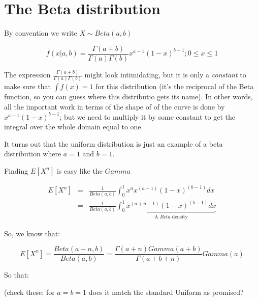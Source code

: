 \documentclass[12pt]{extbook}
\begin{document}



\section{The Beta distribution}

{\color{green} By convention we write $X \sim Beta(a,b)$}

\begin{displaymath}
f(x|a,b) = \frac{\Gamma(a + b)}{\Gamma(a)\Gamma(b)} x^{a-1}(1-x)^{b-1};0 \leq x \leq 1
\end{displaymath}

The expression $\frac{\Gamma(a + b)}{\Gamma(a)\Gamma(b)}$ might look intimidating, but it is only a \emph{constant} to make sure that $\int f(x)=1$ for this distribution (it's the reciprocal of the Beta function, so you can guess where this distributio gets its name).   In other words, all the important work in terms of the shape of of the curve is done by $ x^{a-1}(1-x)^{b-1}$; but we need to multiply it by some constant to get the integral over the whole domain equal to one.

It turns out that the uniform distribution is just an example of a beta distribution where $a=1$ and $b=1$.




Finding $E[X^n]$ is easy like the $Gamma$

\begin{eqnarray*}
E[X^n] &=& \frac{1}{Beta(a,b)} \int_{0}^1 x^n x^{(a-1)}(1-x)^{(b-1)}dx \\
&=&  \frac{1}{Beta(a,b)} \int_{0}^1 \underbrace{x^{(a+n-1)}(1-x)^{(b-1)}dx}_{\mbox{A } Beta \mbox{ density}} 
\end{eqnarray*}

So, we know that:

\begin{displaymath}
E[X^n] = \frac{Beta(a-n, b)}{Beta(a,b)} = \frac{\Gamma(a+n) Gamma(a+b)}{\Gamma(a+b+n)}{Gamma(a)}
\end{displaymath}

So that:




(check these: for $a=b=1$ does it match the standard Uniform as promised?
\end{document}
